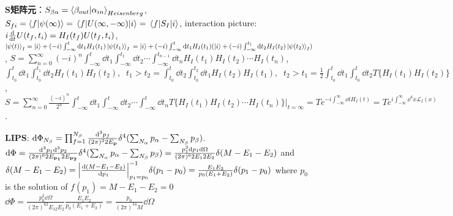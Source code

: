 \documentclass[11pt]{article}
\newcommand{\lag}{\mathcal{L}}
\renewcommand{\a}{\alpha}
\renewcommand{\b}{\beta}
\begin{document}
{\bf S矩阵元}：$S_{\b\a}=\braket{\b_{out}}{\a_{in}}_{Heisenberg}$, $S_{fi}=\braket{f}{\psi(\infty)}=\mel{f}{U(\infty,-\infty)}{i}=\mel{f}{S_I}{i}$,
interaction picture: $i\dv{t}U(t_f,t_i)=H_I(t_f)U(t_f,t_i)$,
$\ket{\psi(t)}_I=\ket{i}+(-i)\int_{-\infty}^{t}\dd t_1H_I(t_1)\ket{\psi(t_1)}_I\\=\ket{i}+(-i)\int_{-\infty}^{t}\dd t_1H_I(t_1)(\ket{i}+(-i)\int_{-\infty}^{t_1}\dd t_2H_I(t_2)\ket{\psi(t_2)}_I)$,
$S=\sum_{n=0}^{\infty}(-i)^n\int_{-\infty}^{t}\dd t_1\int_{-\infty}^{t_1}\dd t_2 \cdots\int_{-\infty}^{t_{n-1}}\dd t_n H_I(t_1)H_I(t_2)\cdots H_I(t_n) $,
$\int_{t_0}^{t}\dd t_1\int_{t_0}^{t_1}\dd t_2  H_I(t_1)H_I(t_2),\;\;t_1>t_2=\int_{t_0}^{t}\dd t_2\int_{t_0}^{t_2}\dd t_1  H_I(t_2)H_I(t_1),\;\;t_2>t_1=\frac{1}{2}\int_{t_0}^{t}\dd t_1\int_{t_0}^{t}\dd t_2  T\{H_I(t_1)H_I(t_2)\}$,
$S=\sum_{n=0}^{\infty}\frac{(-i)^n}{2^n}\int_{-\infty}^{t}\dd t_1\int_{-\infty}^{t}\dd t_2 \cdots\int_{-\infty}^{t}\dd t_n T\{H_I(t_1)H_I(t_2)\cdots H_I(t_n)\}|_{t=\infty}=Te^{-i\int_{-\infty}^{\infty}\dd tH_I(t)}=Te^{i\int_{-\infty}^{\infty}\dd^4 x\lag_I(x)}$.

{\bf LIPS}: $\dd\Phi_{N_{\beta}}=\prod_{f=1}^{N_{\beta}}\frac{\dd^3p_f}{(2\pi)^32E_{\vb{p}}}\delta^4(\sum_{N_{\alpha}}p_{\alpha}-\sum_{N_{\beta}} p_{\beta})$. $\dd\Phi=\frac{\dd^3p_1\dd^3p_2}{(2\pi)^62E_{\vb{p_1}}2E_{\vb{p_2}}}\delta^4(\sum_{N_{\alpha}}p_{\alpha}-\sum_{N_{\beta}} p_{\beta})=\frac{p_1^2\dd p_1\dd\Omega}{(2\pi)^62E_12E_2}\delta(M-E_1-E_2)$ and $\delta(M-E_1-E_2)=\abs{\dv{(M-E_1-E_2)}{p_1}}^{-1}_{p_1=p_0}\delta(p_1-p_0)=\frac{E_1E_2}{p_0(E_1+E_2)}\delta(p_1-p_0)$ where $p_0$ is the solution of $f(p_1)=M-E_1-E_2=0$ $\dd\Phi=\frac{p_0^2\dd\Omega}{(2\pi)^62E_12E_2}\frac{E_1E_2}{p_0(E_1+E_2)}=\frac{p_0}{(2\pi)^34M}\dd\Omega$
\end{document}
